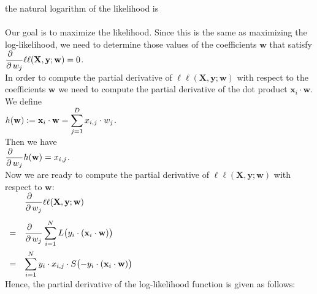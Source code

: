 the natural logarithm of the likelihood is 
\\[0.2cm]
\hspace*{1.3cm}
\colorbox{red}{}
\\[0.2cm]
Our goal is to maximize the likelihood.  Since this is the same as maximizing the log-likelihood, we
need to determine those values of the coefficients $\mathbf{w}$ that satisfy
\\[0.2cm]
\hspace*{1.3cm}
$\displaystyle \frac{\partial\quad}{\partial\, w_j}\ell\ell(\mathbf{X},\mathbf{y};\mathbf{w}) = 0$.
\\[0.2cm]
In order to compute the partial derivative of $\ell\ell(\mathbf{X},\mathbf{y};\mathbf{w})$ with respect to the
coefficients $\mathbf{w}$ we need to compute the partial derivative of the dot product $\mathbf{x}_i \cdot \mathbf{w}$.
We define
\\[0.2cm]
\hspace*{1.3cm}
$\displaystyle h(\mathbf{w}) := \mathbf{x}_i \cdot \mathbf{w} = \sum\limits_{j=1}^D x_{i,j} \cdot w_j$.
\\[0.2cm]
Then we have
\\[0.2cm]
\hspace*{1.3cm}
$\displaystyle \frac{\partial\quad}{\partial\, w_j} h(\mathbf{w}) = x_{i,j}$.
\\[0.2cm]
Now we are ready to compute the partial derivative of $\ell\ell(\mathbf{X},\mathbf{y};\mathbf{w})$ with respect to $\mathbf{w}$:
\\[0.2cm]
\hspace*{1.3cm}
$
\begin{array}{cl}
  & \displaystyle \frac{\partial\quad}{\partial\, w_j} \ell\ell(\mathbf{X},\mathbf{y};\mathbf{w}) \\[0.5cm]
= & \displaystyle \frac{\partial\quad}{\partial\, w_j} 
    \sum\limits_{i=1}^N L\bigl(y_i \cdot(\mathbf{x}_i \cdot \mathbf{w})\bigr) 
    \\[0.5cm]
= & \displaystyle\sum\limits_{i=1}^N y_i \cdot x_{i,j} \cdot  S\bigl(-y_i \cdot(\mathbf{x}_i \cdot \mathbf{w})\bigr)
\end{array}
$
\\[0.2cm]
Hence, the partial derivative of the log-likelihood function is given as follows:
\\[0.2cm]
\hspace*{1.3cm}
